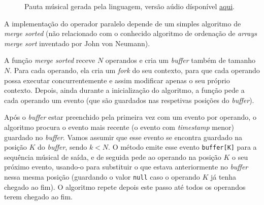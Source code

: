 \begin{figure}[ht]
  \centering
  {%
  \setlength{\fboxsep}{0pt}%
  \setlength{\fboxrule}{0pt}%
  }%
  \caption{Pauta músical gerada pela linguagem, versão aúdio dísponível \href{https://drive.google.com/open?id=1ENTm3hZonYHyQIOgRZ8TQ1Qz-AfRLt2I}{\underline{aqui}}\protect\footnotemark.}
  \label{fig:ops-parallel}
\end{figure}

A implementação do operador paralelo depende de um simples algoritmo de \textit{merge sorted} (não relacionado com o conhecido algoritmo de ordenação de \textit{arrays merge sort } inventado por John von Neumann).

A função \textit{merge sorted} receve $N$ operandos e cria um \textit{buffer} também de tamanho $N$. Para cada operando, ela cria um \textit{fork} do seu contexto, para que cada operando possa executar concurrentemente e assim modificar apenas o seu próprio contexto. Depois, ainda durante a inicialização do algoritmo, a função pede a cada operando um evento (que são guardados nas respetivas posições do \textit{buffer}).

Após o \textit{buffer} estar preenchido pela primeira vez com um evento por operando, o algoritmo procura o evento mais recente (o evento com \textit{timestamp} menor) guardado no \textit{buffer}. Vamos assumir que esse evento se encontra guardado na posição $K$ do \textit{buffer}, sendo $k < N$. O método emite esse evento \texttt{buffer[K]} para a sequência músical de saída, e de seguida pede ao operando na posição $K$ o seu próximo evento, usando-o para substituir o que estava anteriormente no \textit{buffer} nessa mesma posição (guardando o valor \texttt{null} caso o operando $K$ já tenha chegado ao fim). O algoritmo repete depois este passo até todos os operandos terem chegado ao fim.

